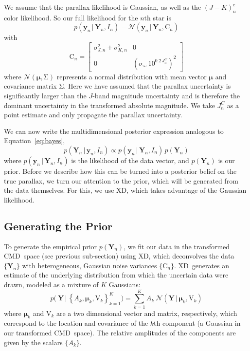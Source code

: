 \documentclass[modern]{aastex61}
\newcommand{\acronym}[1]{{\small{#1}}}
\newcommand{\xd}{\acronym{XD}}
\newcommand{\cmd}{\acronym{CMD}}
\newcommand{\given}{\,|\,}
\renewcommand{\vec}[1]{\boldsymbol{{#1}}}
\newcommand{\truth}{\vec{Y}}
\newcommand{\data}{\vec{y}}
\newcommand{\mean}{\vec{\mu}}
\newcommand{\mat}[1]{{\mathrm{{#1}}}}
\newcommand{\var}{\mat{V}}
\newcommand{\covar}{\mat{C}}
\begin{document}
We assume that the parallax likelihood is Gaussian, as well as the $(J-K)^c_n$ color likelihood. So our full likelihood for the $n$th star is
\begin{equation}
p(\data_n \given \truth_n, I_n) = \mathcal{N}(\data_n \given \truth_n, \covar_n)
\end{equation}
with \\
\[
\covar_n = \begin{bmatrix}
\sigma_{J,n}^2 + \sigma_{K,n}^2 & 0 \\
0 & \left(\sigma_{\varpi}\,10^{0.2\,J_n^C}\right)^2
\end{bmatrix}
\]
where $\mathcal{N}(\mean, \mat{\Sigma})$ represents a normal distribution with
mean vector $\mean$ and covariance matrix $\mat{\Sigma}$.
Here we have assumed that the parallax uncertainty is significantly larger than the $J$-band magnitude uncertainty and is therefore the dominant uncertainty in the transformed absolute magnitude. We take $J_n^C$ as a point estimate and only propagate the parallax uncertainty.

We can now write the multidimensional posterior expression analogous to Equation~\ref{eq:bayes},
\begin{equation}
p(\truth_n \given \data_n, I_n) \propto p(\data_n \given \truth_n, I_n) \, p(\truth_n) \label{eq:posterior}
\end{equation}
where $p(\data_n \given \truth_n, I_n)$ is the likelihood of the data vector, and $p(\truth_n)$ is our prior.
Before we describe how this can be turned into a posterior belief on the true parallax, we turn our attention to the prior, which will be generated from the data themselves. For this, we use XD, which takes advantage of the Gaussian likelihood.

\subsection{Generating the Prior}

To generate the empirical prior $p(\truth_n)$,
we fit our data in the transformed \cmd\ space (see previous sub-section) using \xd,
which deconvolves the data $\{ \truth_n \}$ with heterogeneous,
Gaussian noise variances $\{ \covar_n\}$. \xd\ generates an estimate of the underlying distribution from which the uncertain data were drawn, modeled as a mixture of $K$ Gaussians:
\begin{equation}
	p\bigl(\ \truth \given  \left\{A_k, \mean_k, \var_k\right\}_{k=1}^K \bigr) = \sum_{k=1}^K A_k \ \mathcal{N}(\truth \given \mean_k, \var_k )
\end{equation}
where $\mean_k$ and $\var_k$ are a two dimensional vector and matrix, respectively, which correspond to the location and covariance of the $k$th component (a Gaussian in our transformed \cmd\ space). The relative amplitudes of the components are given by the scalars $\{ A_k \}$.
\end{document}
